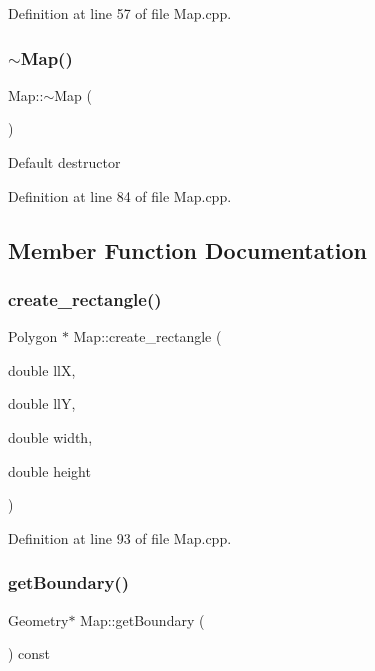 Definition at line 57 of file Map.\+cpp.

\mbox{\label{class_map_aa403fbe09394ccf39747588f5168e3b2}} 
\subsubsection{$\sim$\+Map()}
{\footnotesize\ttfamily Map\+::$\sim$\+Map (\begin{DoxyParamCaption}{ }\end{DoxyParamCaption})\hspace{0.3cm}{\ttfamily [virtual]}}

Default destructor 

Definition at line 84 of file Map.\+cpp.



\subsection{Member Function Documentation}
\mbox{\label{class_map_a222f5585368eeb768b63b612207b6965}} 
\subsubsection{create\+\_\+rectangle()}
{\footnotesize\ttfamily Polygon $\ast$ Map\+::create\+\_\+rectangle (\begin{DoxyParamCaption}\item[{double}]{llX,  }\item[{double}]{llY,  }\item[{double}]{width,  }\item[{double}]{height }\end{DoxyParamCaption})\hspace{0.3cm}{\ttfamily [private]}}



Definition at line 93 of file Map.\+cpp.

\mbox{\label{class_map_a74dd5445ed90bea2a9cc3240bc23f1bc}} 
\subsubsection{get\+Boundary()}
{\footnotesize\ttfamily Geometry$\ast$ Map\+::get\+Boundary (\begin{DoxyParamCaption}{ }\end{DoxyParamCaption}) const\hspace{0.3cm}{\ttfamily [inline]}}



